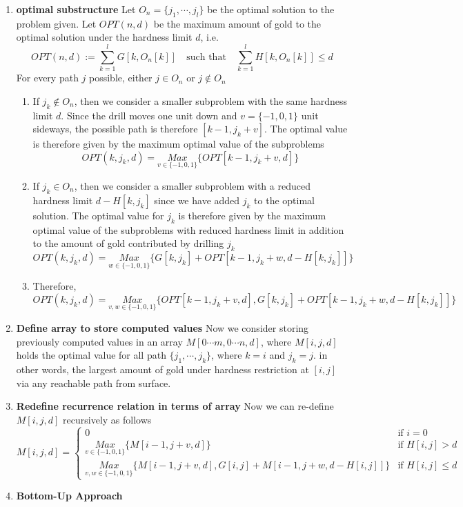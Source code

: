 \documentclass[11pt]{article}
\begin{document}
\begin{solution}
  \begin{enumerate}
    \item \textbf{optimal substructure} Let $O_n = \{ j_1,\cdots, j_l\}$ be the optimal solution to the problem given. Let $OPT(n, d)$ be the maximum amount of gold to the optimal solution under the hardness limit $d$, i.e.
    \[
      OPT(n, d) := \sum_{k=1}^{l} G[k, O_n[k]] \quad \text{such that}\quad \sum_{k=1}^{l} H[k, O_n[k]] \leq d
    \]
    For every path $j$ possible, either $j\in O_n$ or $j\not\in O_n$
    \begin{enumerate}
      \item If $j_k \not\in O_n$, then we consider a smaller subproblem with the same hardness limit $d$. Since the drill moves one unit down and $v = \{ -1, 0, 1\}$ unit sideways, the possible path is therefore $[k-1, j_k + v]$. The optimal value is therefore given by the maximum optimal value of the subproblems
      \[
        OPT(k, j_k, d) = \underset{v\in\{-1,0,1\}}{Max}\{ OPT[k-1, j_k + v, d]\}
      \]
      \item If $j_k \in O_n$, then we consider a smaller subproblem with a reduced hardness limit $d - H[k, j_k]$ since we have added $j_k$ to the optimal solution. The optimal value for $j_k$ is therefore given by the maximum optimal value of the subproblems with reduced hardness limit in addition to the amount of gold contributed by drilling $j_k$
      \[
        OPT(k, j_k, d) = \underset{w\in\{-1,0,1\}}{Max}\{ G[k, j_k] + OPT[k-1, j_k + w, d-H[k, j_k]]\}
      \]
      \item Therefore,
      \[
        OPT(k, j_k, d) = \underset{v, w\in\{-1,0,1\}}{Max}\{ OPT[k-1, j_k + v, d], G[k, j_k] + OPT[k-1, j_k + w, d-H[k, j_k]]\}
      \]
    \end{enumerate}

  \item \textbf{Define array to store computed values} Now we consider storing previously computed values in an array $M[0\cdots m, 0\cdots n, d]$, where $M[i, j, d]$ holds the optimal value for all path $\{ j_1, \cdots, j_k\}$, where $k = i$ and $j_k = j$. in other words, the largest amount of gold under hardness restriction at $[i, j]$ via any reachable path from surface.
  \item \textbf{Redefine recurrence relation in terms of array} Now we can re-define $M[i, j, d]$ recursively as follows
  \[
    M[i, j, d] =
    \begin{cases}
      0 & \text{if } i = 0\\
      \underset{v\in\{-1,0,1\}}{Max}\{ M[i-1, j + v, d]\} & \text{if } H[i, j] > d \\
      \underset{v, w\in\{-1,0,1\}}{Max}\{ M[i-1, j + v, d], G[i, j] + M[i-1, j + w, d-H[i, j]]\} & \text{if } H[i, j] \leq d
    \end{cases}
  \]
  \item \textbf{Bottom-Up Approach}


\end{enumerate}
\end{solution}
\end{document}
